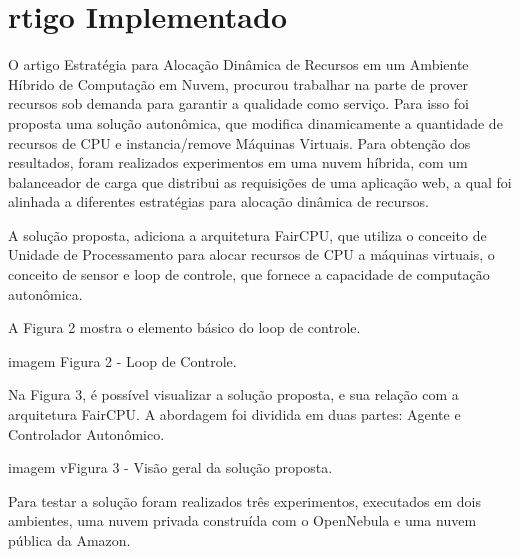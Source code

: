 \chapter[Artigo Implementado]{rtigo Implementado}\label{cap1}

O artigo Estratégia para Alocação Dinâmica de Recursos em um Ambiente Híbrido de Computação em Nuvem, procurou trabalhar na parte de prover recursos sob demanda para garantir a qualidade como serviço. Para isso foi proposta uma solução autonômica, que modifica dinamicamente a quantidade de recursos de CPU  e instancia/remove Máquinas Virtuais.  Para obtenção dos resultados, foram realizados experimentos em uma nuvem híbrida, com um balanceador de carga que distribui as requisições de uma aplicação web, a qual foi alinhada a diferentes estratégias para alocação dinâmica de recursos.

A solução proposta, adiciona a arquitetura FairCPU, que utiliza o conceito de Unidade de Processamento para alocar recursos de CPU a máquinas virtuais, o conceito de sensor e loop de controle, que fornece a capacidade de computação autonômica.

A Figura 2 mostra o elemento básico do loop de controle.


imagem Figura 2 - Loop de Controle.


Na Figura 3, é possível visualizar a solução proposta, e sua relação com a arquitetura FairCPU. A abordagem foi dividida em duas partes: Agente e Controlador Autonômico.


imagem vFigura 3 - Visão geral da solução proposta.

Para testar a solução foram realizados três experimentos, executados em dois ambientes, uma nuvem privada construída com o OpenNebula e uma nuvem pública da Amazon.
